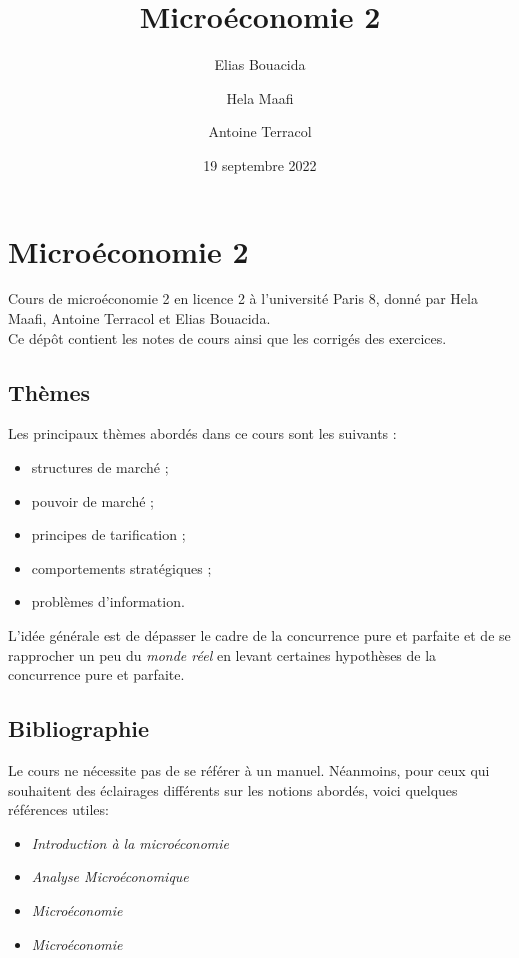 \documentclass[
  a4paper,
]{book}
\title{Microéconomie 2}
\author{Elias Bouacida \and Hela Maafi \and Antoine Terracol}
\date{19 septembre 2022}
\providecommand{\tightlist}{%
  \setlength{\itemsep}{0pt}\setlength{\parskip}{0pt}}
\theoremstyle{definition}
\theoremstyle{definition}
\theoremstyle{definition}
\theoremstyle{definition}
\theoremstyle{remark}
\begin{document}
\maketitle

{
\setcounter{tocdepth}{1}
\tableofcontents
}
\hypertarget{microuxe9conomie-2}{%
\chapter{Microéconomie 2}\label{microuxe9conomie-2}}

Cours de microéconomie 2 en licence 2 à l'université Paris 8, donné par Hela Maafi, Antoine Terracol et Elias Bouacida.\\
Ce dépôt contient les notes de cours ainsi que les corrigés des exercices.

\hypertarget{thuxe8mes}{%
\section{Thèmes}\label{thuxe8mes}}

Les principaux thèmes abordés dans ce cours sont les suivants :

\begin{itemize}
\tightlist
\item
  structures de marché ;
\item
  pouvoir de marché ;
\item
  principes de tarification ;
\item
  comportements stratégiques ;
\item
  problèmes d'information.
\end{itemize}

L'idée générale est de dépasser le cadre de la concurrence pure et parfaite et de se rapprocher un peu du \emph{monde réel} en levant certaines hypothèses de la concurrence pure et parfaite.

\hypertarget{bibliographie}{%
\section{Bibliographie}\label{bibliographie}}

Le cours ne nécessite pas de se référer à un manuel.
Néanmoins, pour ceux qui souhaitent des éclairages différents sur les notions abordés, voici quelques références utiles:

\begin{itemize}
\tightlist
\item
  \citet{varian2015} \emph{Introduction à la microéconomie}
\item
  \citet{varian2008} \emph{Analyse Microéconomique}
\item
  \citet{pindyck2012} \emph{Microéconomie}
\item
  \citet{jeleva2014} \emph{Microéconomie}
\end{itemize}
\end{document}
